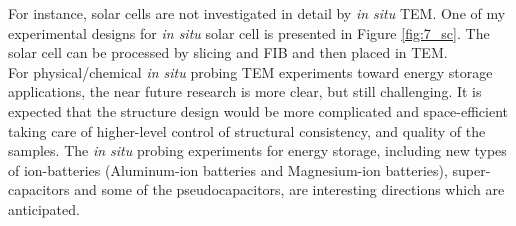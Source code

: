 For instance, solar cells are not investigated in detail by \textit{in situ} TEM. One of my experimental designs for \textit{in situ} solar cell is presented in Figure \ref{fig:7_sc}. The solar cell can be processed by slicing and FIB and then placed in TEM. \\ 

For physical/chemical \textit{in situ} probing TEM experiments toward energy storage applications, the near future research is more clear, but still challenging. It is expected that the structure design would be more complicated and space-efficient taking care of higher-level control of structural consistency, and quality of the samples. The \textit{in situ} probing experiments for energy storage, including new types of ion-batteries (Aluminum-ion batteries and Magnesium-ion batteries), super-capacitors and some of the pseudocapacitors, are interesting directions which are anticipated. 


